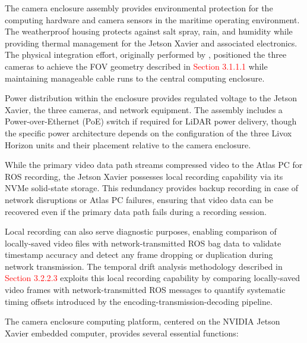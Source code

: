 \documentclass{erauthesis}
\begin{document}
The camera enclosure assembly provides environmental protection for the computing hardware and camera sensors in the maritime operating environment. The weatherproof housing protects against salt spray, rain, and humidity while providing thermal management for the Jetson Xavier and associated electronics. The physical integration effort, originally performed by \cite{thompson2023}, positioned the three cameras to achieve the \ac{FOV} geometry described in \textcolor{red}{Section 3.1.1.1}
while maintaining manageable cable runs to the central computing enclosure.

Power distribution within the enclosure provides regulated voltage to the Jetson Xavier, the three cameras, and network equipment. The assembly includes a Power-over-Ethernet (PoE) switch if required for LiDAR power delivery, though the specific power architecture depends on the configuration of the three Livox Horizon units and their placement relative to the camera enclosure.


While the primary video data path streams compressed video to the Atlas PC for ROS recording, the Jetson Xavier possesses local recording capability via its NVMe solid-state storage. This redundancy provides backup recording in case of network disruptions or Atlas PC failures, ensuring that video data can be recovered even if the primary data path fails during a recording session.

Local recording can also serve diagnostic purposes, enabling comparison of locally-saved video files with network-transmitted ROS bag data to validate timestamp accuracy and detect any frame dropping or duplication during network transmission. The temporal drift analysis methodology described in \textcolor{red}{Section 3.2.2.3}
exploits this local recording capability by comparing locally-saved video frames with network-transmitted ROS messages to quantify systematic timing offsets introduced by the encoding-transmission-decoding pipeline.


The camera enclosure computing platform, centered on the NVIDIA Jetson Xavier embedded computer, provides several essential functions:

\end{document}
